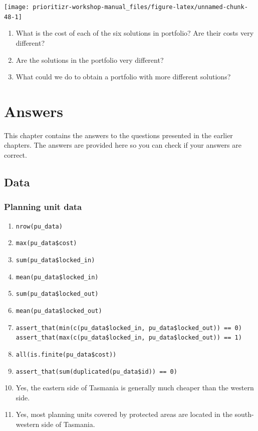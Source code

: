 \documentclass[12pt,]{book}
\providecommand{\tightlist}{%
  \setlength{\itemsep}{0pt}\setlength{\parskip}{0pt}}
\let\BeginKnitrBlock\begin \let\EndKnitrBlock\end
\begin{document}
\begin{center}\texttt{[image: prioritizr-workshop-manual\_files/figure-latex/unnamed-chunk-48-1]} \end{center}

\BeginKnitrBlock{rmdquestion}
\begin{enumerate}
\def\labelenumi{\arabic{enumi}.}
\tightlist
\item
  What is the cost of each of the six solutions in portfolio? Are their
  costs very different?
\item
  Are the solutions in the portfolio very different?
\item
  What could we do to obtain a portfolio with more different solutions?
\end{enumerate}
\EndKnitrBlock{rmdquestion}

\chapter{Answers}\label{answers}

This chapter contains the answers to the questions presented in the
earlier chapters. The answers are provided here so you can check if your
answers are correct.

\section{Data}\label{data}

\subsection{Planning unit data}\label{planning-unit-data-1}

\BeginKnitrBlock{rmdanswer}
\begin{enumerate}
\def\labelenumi{\arabic{enumi}.}
\tightlist
\item
  \texttt{nrow(pu\_data)}
\item
  \texttt{max(pu\_data\$cost)}
\item
  \texttt{sum(pu\_data\$locked\_in)}
\item
  \texttt{mean(pu\_data\$locked\_in)}
\item
  \texttt{sum(pu\_data\$locked\_out)}
\item
  \texttt{mean(pu\_data\$locked\_out)}
\item
  \texttt{assert\_that(min(c(pu\_data\$locked\_in,\ pu\_data\$locked\_out))\ ==\ 0)}
  \texttt{assert\_that(max(c(pu\_data\$locked\_in,\ pu\_data\$locked\_out))\ ==\ 1)}
\item
  \texttt{all(is.finite(pu\_data\$cost))}
\item
  \texttt{assert\_that(sum(duplicated(pu\_data\$id))\ ==\ 0)}
\item
  Yes, the eastern side of Tasmania is generally much cheaper than the
  western side.
\item
  Yes, most planning units covered by protected areas are located in the
  south-western side of Tasmania.
\end{enumerate}
\EndKnitrBlock{rmdanswer}
\end{document}
